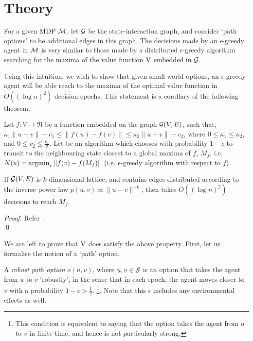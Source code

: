 \section{Theory}
\label{sec:theory}

For a given MDP $\mathcal{M}$, let $\mathcal{G}$ be the state-interaction graph,
and consider `path options' to be additional edges in this graph. The
decisions made by an $\epsilon$-greedy agent in $\mathcal{M}$ is very similar
to those made by a distributed $\epsilon$-greedy algorithm searching
for the maxima of the value function $\operatorname{V}$ embedded in $\mathcal{G}$. 

Using this intuition, we wish to show that given small world options,
an $\epsilon$-greedy agent will be able reach to the maxima of the
optimal value function in $O( (\log n)^2 )$ decision epochs. This
statement is a corollary of the following theorem,

\begin{theorem}
    \label{thm:small-world}
    Let $f : V \to \Re$ be a function embedded on the graph
    $\mathcal{G}(V,E)$, such that, $\kappa_1 \|u-v\| - c_1 \le \|f(u) -
    f(v)\| \le \kappa_2 \|u - v\| - c_2$, where $0 \le \kappa_1 \le
    \kappa_2$, and $0 \le c_2 \le \frac{c_1}{2}$. Let \egreedyalgo be
    an algorithm which chooses with probability $1-\epsilon$ to
    transit to the neighbouring state closest to a global maxima of
    $f$, $M_f$, i.e. $N(u) = \operatorname{argmin}_v \|f(v) - f(M_f)\|$ (i.e.
    $\epsilon$-greedy algorithm with respect to $f$).
    
    If $\mathcal{G}(V,E)$ is $k$-dimensional lattice, and contains edges
    distributed according to the inverse power law $p(u,v) \propto
    \|u-v\|^{-k}$, then \egreedyalgo takes $O( (\log n)^2 )$ decisions
    to reach $M_f$.
\end{theorem}
\begin{proof}
    Refer .
    \\ \qed
\end{proof}

We are left to prove that $\operatorname{V}$ does satisfy the above property.
First, let us formalise the notion of a `path' option.

\begin{definition}
    A {\em robust path option} $o(u,v)$, where $u,v \in \mathcal{S}$ is an
    option that takes the agent from $u$ to $v$ `robustly', in the
    sense that in each epoch, the agent moves closer to $v$ with a
    probability $1-\epsilon > \frac{1}{2}$. \footnote{This condition
    is equivalent to saying that the option takes the agent from $u$
    to $v$ in finite time, and hence is not particularly strong.}.
    Note that this $\epsilon$ includes any environmental effects as
    well.
\end{definition}

